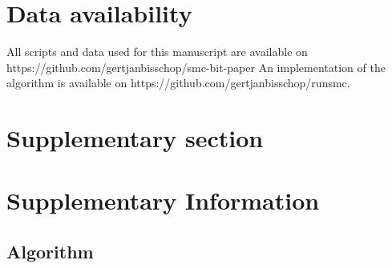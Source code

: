 \documentclass{article}
\newcommand{\supplementarysection}{%
  \setcounter{figure}{0}%
  \let\oldthefigure\thefigure%
  \renewcommand{\thefigure}{S\oldthefigure}%
  \section{Supplementary section}%
}
\begin{document}


\section{Data availability}

All scripts and data used for this manuscript are available on https://github.com/gertjanbisschop/smc-bit-paper
An implementation of the algorithm is available on https://github.com/gertjanbisschop/runsmc.
\FloatBarrier



\pagebreak

\supplementarysection
\section*{Supplementary Information}

\subsection{Algorithm} \label{par:algo}
\end{document}
